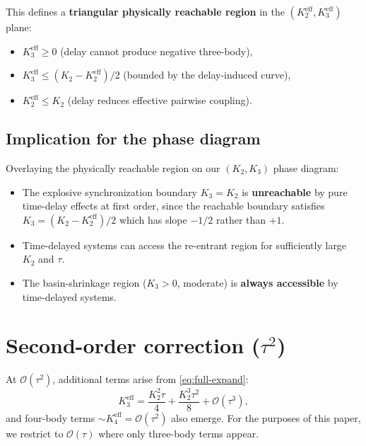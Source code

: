 \documentclass[11pt]{article}
\newcommand{\Order}{\mathcal{O}}
\begin{document}
This defines a \textbf{triangular physically reachable region} in the
$(K_2^{\mathrm{eff}}, K_3^{\mathrm{eff}})$ plane:
\begin{itemize}
  \item $K_3^{\mathrm{eff}} \ge 0$ (delay cannot produce negative three-body),
  \item $K_3^{\mathrm{eff}} \le (K_2 - K_2^{\mathrm{eff}})/2$ (bounded by
    the delay-induced curve),
  \item $K_2^{\mathrm{eff}} \le K_2$ (delay reduces effective pairwise coupling).
\end{itemize}

\subsection{Implication for the phase diagram}

Overlaying the physically reachable region on our $(K_2, K_3)$ phase diagram:
\begin{itemize}
  \item The explosive synchronization boundary $K_3 = K_2$ is
    \textbf{unreachable} by pure time-delay effects at first order, since
    the reachable boundary satisfies $K_3 = (K_2 - K_2^{\mathrm{eff}})/2$
    which has slope $-1/2$ rather than $+1$.
  \item Time-delayed systems can access the re-entrant region for sufficiently
    large $K_2$ and $\tau$.
  \item The basin-shrinkage region ($K_3>0$, moderate) is \textbf{always
    accessible} by time-delayed systems.
\end{itemize}


\section{Second-order correction ($\tau^2$)}

At $\Order(\tau^2)$, additional terms arise from \eqref{eq:full-expand}:
\begin{equation}
  K_3^{\mathrm{eff}} = \frac{K_2^2\tau}{4}
  + \frac{K_2^3\tau^2}{8} + \Order(\tau^3),
\end{equation}
and four-body terms $\sim K_4^{\mathrm{eff}} = \Order(\tau^2)$ also emerge.
For the purposes of this paper, we restrict to $\Order(\tau)$ where only
three-body terms appear.
\end{document}
